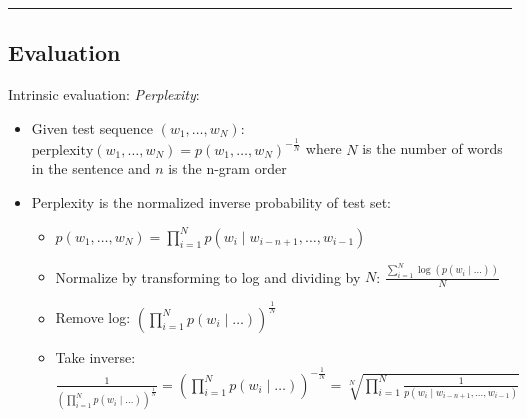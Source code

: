 {\color{black}\hrule height 0.001mm}

\subsection*{Evaluation}
Intrinsic evaluation: \emph{Perplexity}:
\begin{itemize}
    \item Given test sequence $(w_1, \dots, w_N)$:
    $
    \text{perplexity}(w_1, \dots, w_N) = p(w_1, \dots, w_N)^{-\frac{1}{N}} 
    $
    where $N$ is the number of words in the sentence and $n$ is the n-gram order
    \item Perplexity is the normalized inverse probability of test set:
    \begin{itemize}
        \item $
        p(w_1, \dots, w_N) = \prod_{i=1}^N p(w_i \mid w_{i-n+1}, \dots, w_{i-1})
        $
        \item Normalize by transforming to log and dividing by $N$:
        $
        \frac{\sum_{i=1}^N \log \left( p(w_i \mid \dots) \right)}{N}
        $
        \item Remove log:
        $
        \left( \prod_{i=1}^N p(w_i \mid \dots) \right)^{\frac{1}{N}}
        $
        \item Take inverse:
        $
        \frac{1}{\left( \prod_{i=1}^N p(w_i \mid \dots) \right)^{\frac{1}{N}}} = \left( \prod_{i=1}^N p(w_i \mid \dots) \right)^{-\frac{1}{N}} = \sqrt[N]{ \prod_{i=1}^N \frac{1}{p(w_i \mid w_{i-n+1}, \dots, w_{i-1})}}
        $
    \end{itemize}
\end{itemize}